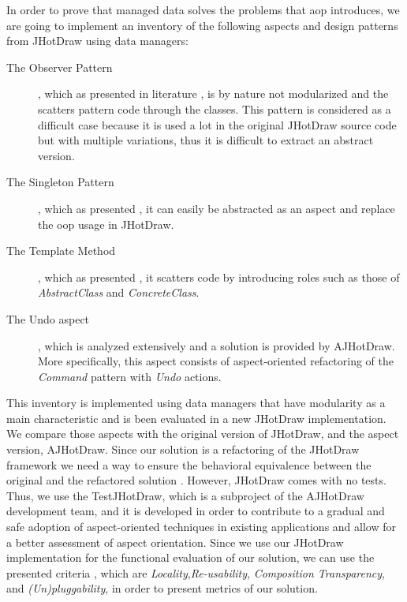 In order to prove that managed data solves the problems that \ac{aop} introduces, we are going to implement an inventory of the following aspects and design patterns from JHotDraw using data managers:
\begin{description}
  \item[The Observer Pattern], which as presented in literature \cite{tourwe2003existence} \cite{hannemann2005role} \cite{marin2005approach}, is by nature not modularized and the scatters pattern code through the classes. 
  This pattern is considered as a difficult case because it is used a lot in the original JHotDraw source code but with multiple variations, thus it is difficult to extract an abstract version.

  \item[The Singleton Pattern], which as presented \cite{hannemann2005role} \cite{hannemann2002design}, it can easily be abstracted as an aspect and replace the \ac{oop} usage in JHotDraw. 

  \item[The Template Method], which as presented \cite{hannemann2005role} \cite{hannemann2002design}, it scatters code by introducing roles such as those of \textit{AbstractClass} and \textit{ConcreteClass}.

  \item[The Undo aspect], which is analyzed extensively \cite{marin2004refactoring} and a solution is provided by AJHotDraw. 
  More specifically, this aspect consists of aspect-oriented refactoring of the \textit{Command} pattern with \textit{Undo} actions.
\end{description}

This inventory is implemented using data managers that have modularity as a main characteristic and is been evaluated in a new JHotDraw implementation. 
We compare those aspects with the original version of JHotDraw, and the aspect version, AJHotDraw. 
Since our solution is a refactoring of the JHotDraw framework we need a way to ensure the behavioral equivalence between the original and the refactored solution \cite{fowler2009refactoring}. 
However, JHotDraw comes with no tests. 
Thus, we use the TestJHotDraw, which is a subproject of the AJHotDraw development team, and it is developed in order to contribute to a gradual and safe adoption of aspect-oriented techniques in existing applications and allow for a better assessment of aspect orientation.
Since we use our JHotDraw implementation for the functional evaluation of our solution, we can use the presented criteria \cite{hannemann2002design}, which are \textit{Locality},\textit{Re-usability}, \textit{Composition Transparency}, and \textit{(Un)pluggability}, in order to present metrics of our solution. 

